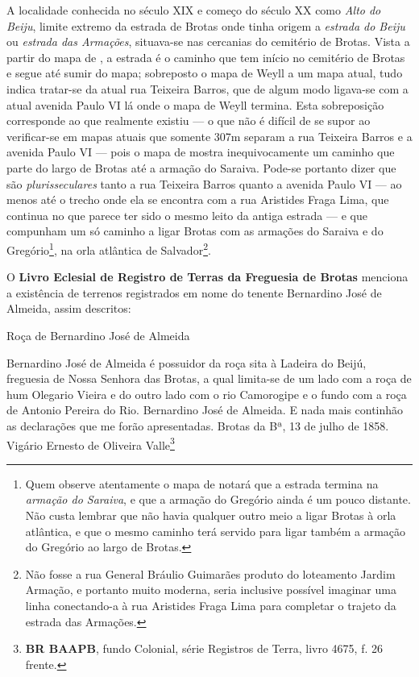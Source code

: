 A localidade conhecida no século XIX e começo do século XX como \textit{Alto do Beiju}, limite extremo da estrada de Brotas onde tinha origem a \textit{estrada do Beiju} ou \textit{estrada das Armações}, situava-se nas cercanias do cemitério de Brotas. Vista a partir do mapa de , a estrada é o caminho que tem início no cemitério de Brotas e segue até sumir do mapa; sobreposto o mapa de Weyll a um mapa atual, tudo indica tratar-se da atual rua Teixeira Barros, que de algum modo ligava-se com a atual avenida Paulo VI lá onde o mapa de Weyll termina. Esta sobreposição corresponde ao que realmente existiu --- o que não é difícil de se supor ao verificar-se em mapas atuais que somente 307m separam a rua Teixeira Barros e a avenida Paulo VI --- pois o mapa de  mostra inequivocamente um caminho que parte do largo de Brotas até a armação do Saraiva. Pode-se portanto dizer que são \textit{plurisseculares} tanto a rua Teixeira Barros quanto a avenida Paulo VI --- ao menos até o trecho onde ela se encontra com a rua Aristides Fraga Lima, que continua no que parece ter sido o mesmo leito da antiga estrada --- e que compunham um só caminho a ligar Brotas com as armações do Saraiva e do Gregório\footnote{Quem observe atentamente o mapa de  notará que a estrada termina na \textit{armação do Saraiva}, e que a armação do Gregório ainda é um pouco distante. Não custa lembrar que não havia qualquer outro meio a ligar Brotas à orla atlântica, e que o mesmo caminho terá servido para ligar também a armação do Gregório ao largo de Brotas.}, na orla atlântica de Salvador\footnote{Não fosse a rua General Bráulio Guimarães produto do loteamento Jardim Armação, e portanto muito moderna, seria inclusive possível imaginar uma linha conectando-a à rua Aristides Fraga Lima para completar o trajeto da estrada das Armações.}. 

O \textbf{Livro Eclesial de Registro de Terras da Freguesia de Brotas} menciona a existência de terrenos registrados em nome do tenente Bernardino José de Almeida, assim descritos:

\begin{citacao}
Roça de Bernardino José de Almeida

Bernardino José de Almeida é possuidor da roça sita à Ladeira do Beijú, freguesia de Nossa Senhora das Brotas, a qual limita-se de um lado com a roça de hum Olegario Vieira e do outro lado com o rio Camorogipe e o fundo com a roça de Antonio Pereira do Rio. Bernardino José de Almeida. E nada mais continhão as declarações que me forão apresentadas. Brotas da Bª, 13 de julho de 1858. Vigário Ernesto de Oliveira Valle\footnote{\textbf{BR BAAPB}, fundo Colonial, série Registros de Terra, livro 4675, f. 26 frente.}
\end{citacao}


